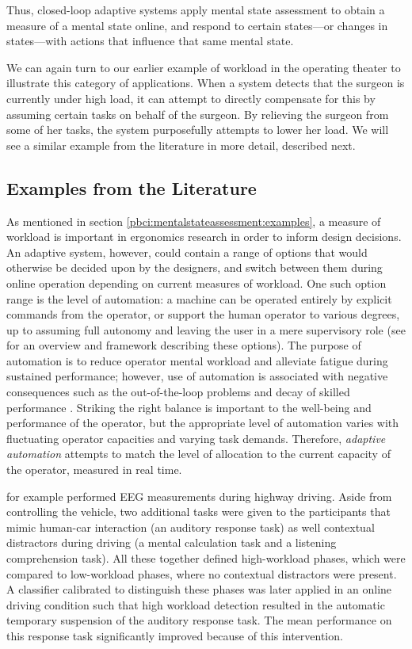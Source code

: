 Thus, closed-loop adaptive systems apply mental state assessment to obtain a measure of a mental state online, and respond to certain states---or changes in states---with actions that influence that same mental state. 

We can again turn to our earlier example of workload in the operating theater to illustrate this category of applications. When a system detects that the surgeon is currently under high load, it can attempt to directly compensate for this by assuming certain tasks on behalf of the surgeon. By relieving the surgeon from some of her tasks, the system purposefully attempts to lower her load. We will see a similar example from the literature in more detail, described next.


\subsection{Examples from the Literature}
\label{pbci:closedloop:examples}

As mentioned in section \ref{pbci:mentalstateassessment:examples}, a measure of workload is important in ergonomics research in order to inform design decisions. An adaptive system, however, could contain a range of options that would otherwise be decided upon by the designers, and switch between them during online operation depending on current measures of workload. One such option range is the level of automation: a machine can be operated entirely by explicit commands from the operator, or support the human operator to various degrees, up to assuming full autonomy and leaving the user in a mere supervisory role (see  for an overview and framework describing these options). The purpose of automation is to reduce operator mental workload and alleviate fatigue during sustained performance; however, use of automation is associated with negative consequences such as the out-of-the-loop problems and decay of skilled performance \cite{endsley1995ootluf}. Striking the right balance is important to the well-being and performance of the operator, but the appropriate level of automation varies with fluctuating operator capacities and varying task demands. Therefore, \emph{adaptive automation} \cite{byrne1996adaptiveauto} attempts to match the level of allocation to the current capacity of the operator, measured in real time. 

 for example performed EEG measurements during highway driving. Aside from controlling the vehicle, two additional tasks were given to the participants that mimic human-car interaction (an auditory response task) as well contextual distractors during driving (a mental calculation task and a listening comprehension task). All these together defined high-workload phases, which were compared to low-workload phases, where no contextual distractors were present. A classifier calibrated to distinguish these phases was later applied in an online driving condition such that high workload detection resulted in the automatic temporary suspension of the auditory response task. The mean performance on this response task significantly improved because of this intervention. 


